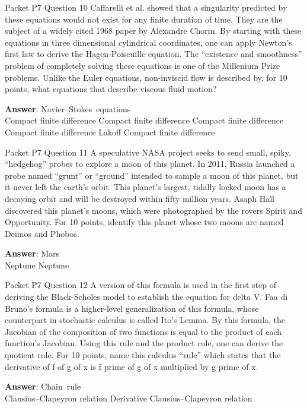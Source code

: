 \begin{frame}{Packet P7 Question 10}
Caffarelli et al. showed that a singularity predicted by these equations would not exist for any finite duration of time. They are the subject of a widely cited 1968 paper by Alexandre Chorin. By starting   with these equations in three dimensional cylindrical coordinates, one can apply Newton’s first law to derive the Hagen-Poiseuille equation. The “existence and   smoothness” problem of completely solving these equations is one of the Millenium Prize problems. Unlike the Euler equations, non-inviscid flow is described by, for 10 points, what equations that describe viscous fluid motion?        

\textbf{Answer}: Navier–Stokes\ equations\\
 Compact finite difference
 Compact finite difference
 Compact finite difference
 Compact finite difference
 Lakoff
 Compact finite difference
\end{frame}

\begin{frame}{Packet P7 Question 11}
A speculative NASA project seeks to send small, spiky, “hedgehog” probes to explore a moon of this planet. In 2011, Russia   launched a probe named “grunt” or “ground” intended to sample a moon of this planet, but it never left the earth’s orbit. This planet’s largest, tidally locked moon has a decaying   orbit and will be destroyed within fifty million years. Asaph Hall discovered this planet’s moons, which were photographed by the rovers Spirit and Opportunity. For 10 points, identify   this planet whose two moons are named Deimos and Phobos.    

\textbf{Answer}: Mars\\
 Neptune
 Neptune
\end{frame}

\begin{frame}{Packet P7 Question 12}
A version of this formula is used in the first step of deriving the Black-Scholes model to establish the equation for delta V. Faa di Bruno's   formula is a higher-level generalization of this formula, whose counterpart in stochastic calculus is called Ito’s Lemma. By this formula, the Jacobian of the composition   of two functions   is equal to   the product of each function’s Jacobian. Using this rule and   the product rule, one can derive the quotient rule. For 10 points, name this calculus “rule” which states that the derivative of f of g of x is f prime of g of x multiplied by g prime of x.  

\textbf{Answer}: Chain\ rule\\
 Clausius–Clapeyron relation
 Derivative
 Clausius–Clapeyron relation
\end{frame}

